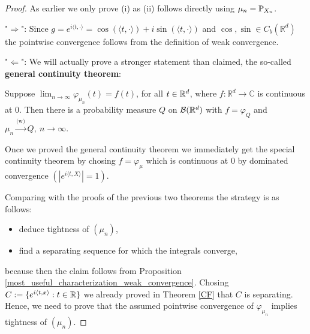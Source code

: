 \begin{proof}[Proof]
As earlier we only prove (i) as (ii) follows directly using $\mu_n=\P_{X_n}$.\smallskip

"$\Rightarrow$": Since $g = e^{i \langle t, \cdot \rangle}=\cos(\langle t,\cdot\rangle)+i\sin(\langle t,\cdot\rangle)$ and $\cos,\sin\in C_b(\mathbb{R}^d)$ the pointwise convergence follows from the definition of weak convergence.\smallskip

"$\Leftarrow$": We will actually prove a stronger statement than claimed, the so-called \textbf{general continuity theorem}:
\begin{lWarnhinweis}
	Suppose $\lim_{n\to\infty}\varphi_{\mu_n}(t)= f(t)$, for all $t\in\R^d$, where $f \colon \mathbb{R}^d \to \mathbb{C}$ is continuous at $0$. Then there is a probability measure $Q$ on $\cB(\R^d)$ with $f = \varphi_Q$ and $\mu_n \overset{\text{(w)}}{\longrightarrow} Q, \: n\to \infty$.
\end{lWarnhinweis}
Once we proved the general continuity theorem we immediately get the special continuity theorem by chosing $f=\varphi_\mu$ which is continuous at $0$ by dominated convergence $(|e^{i\langle t,X\rangle}|=1)$.\smallskip

Comparing with the proofs of the previous two theorems the strategy is as follows:
\begin{itemize}
	\item deduce tightness of $(\mu_n)$,
	\item find a separating sequence for which the integrals converge,
\end{itemize}
because then the claim follows from Proposition \ref{most_useful_characterization_weak_convergence}. Chosing $C:=\{e^{i\langle t,x\rangle}: t\in\R\}$ we already proved in Theorem \ref{CF} that $C$ is separating. Hence, we need to prove that the assumed pointwise convergence of $\varphi_{\mu_n}$ implies tightness of $(\mu_n)$.\smallskip


\end{proof}
